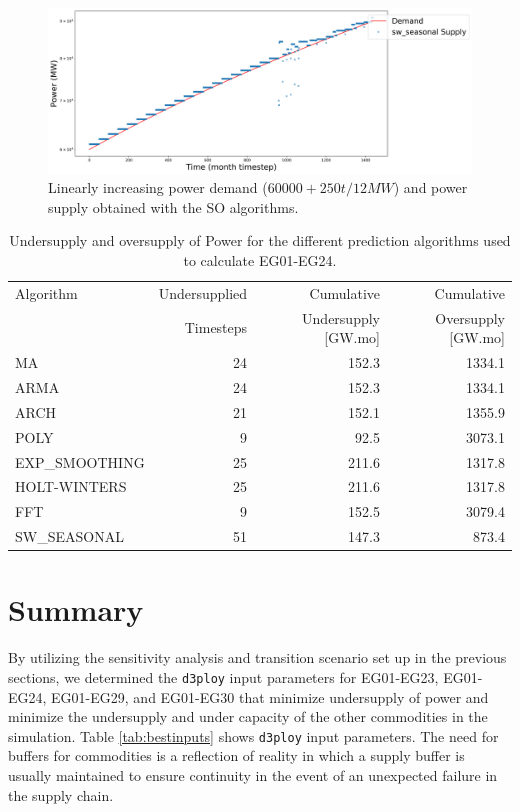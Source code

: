 \documentclass[11pt]{article}
\newcommand{\deploy}{\texttt{d3ploy}\xspace}%
\begin{document}
\begin{figure}[H]
	\centering
	\includegraphics[width=\textwidth]{30-figures/lin-30-power-buffer03.png} 
	\hfill
	\caption{Linearly increasing power demand ($60000 + 250t/12 MW$) and power supply obtained with the SO algorithms.}
	\label{fig:30-lin-SO}
\end{figure}

\begin{table}[H]
	\centering
	\caption{Undersupply and oversupply of Power for the different prediction algorithms used to calculate EG01-EG24.}
	\label{tab:30-lin-power}
	\begin{tabularx}{\textwidth}{lRRR}
		\hline
		Algorithm & Undersupplied & Cumulative  & Cumulative \\
		& Timesteps     & Undersupply [GW.mo]  & Oversupply [GW.mo] \\ \hline
		MA        & 24 & 152.3 & 1334.1 \\ 
		ARMA      & 24 & 152.3 & 1334.1 \\ 
		ARCH      & 21 & 152.1 & 1355.9 \\ 
		POLY      &  9 & 92.5 & 3073.1 \\ 
		EXP\_SMOOTHING 	& 25 & 211.6 & 1317.8 \\ 
		HOLT-WINTERS  	& 25 & 211.6 & 1317.8 \\ 
		FFT       & 9 & 152.5 & 3079.4 \\ 
		SW\_SEASONAL  & 51 & 147.3 & 873.4 \\ \hline
	\end{tabularx}
\end{table}

\section{Summary}
By utilizing the sensitivity analysis and transition scenario set up in the previous 
sections, we determined the \deploy input parameters for EG01-EG23, EG01-EG24, EG01-EG29, 
and EG01-EG30 that minimize undersupply of power and minimize 
the undersupply and under capacity of the other commodities
in the simulation. 
Table \ref{tab:bestinputs} shows \deploy input parameters. 
The need for buffers for commodities is a reflection of reality
in which a supply buffer is usually maintained to ensure 
continuity in the event of an unexpected failure in the supply chain.
\end{document}
